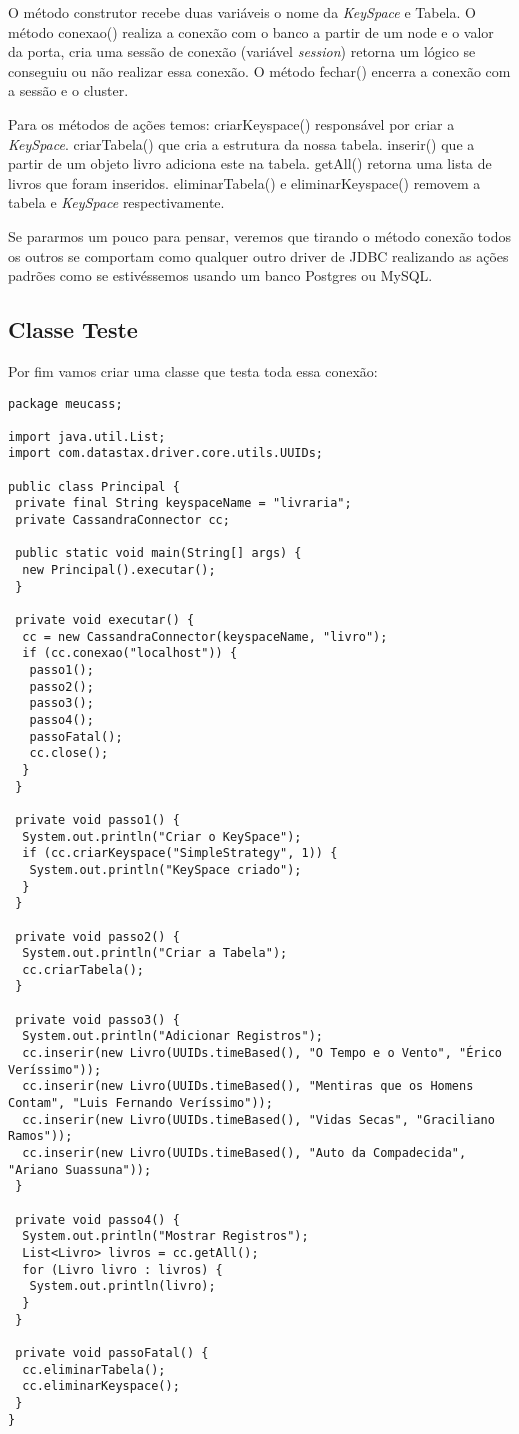 O método construtor recebe duas variáveis o nome da \textit{KeySpace} e Tabela. O método conexao() realiza a conexão com o banco a partir de um node e o valor da porta, cria uma sessão de conexão (variável \textit{session}) retorna um lógico se conseguiu ou não realizar essa conexão. O método fechar() encerra a conexão com a sessão e o cluster.

Para os métodos de ações temos: criarKeyspace() responsável por criar a \textit{KeySpace}. criarTabela() que cria a estrutura da nossa tabela. inserir() que a partir de um objeto livro adiciona este na tabela. getAll() retorna uma lista de livros que foram inseridos. eliminarTabela() e eliminarKeyspace() removem a tabela e \textit{KeySpace} respectivamente.

Se pararmos um pouco para pensar, veremos que tirando o método conexão todos os outros se comportam como qualquer outro driver de JDBC realizando as ações padrões como se estivéssemos usando um banco Postgres ou MySQL.

\subsection{Classe Teste}
Por fim vamos criar uma classe que testa toda essa conexão:
\begin{lstlisting}[]
package meucass;

import java.util.List;
import com.datastax.driver.core.utils.UUIDs;

public class Principal {
 private final String keyspaceName = "livraria";
 private CassandraConnector cc;

 public static void main(String[] args) {
  new Principal().executar();
 }

 private void executar() {
  cc = new CassandraConnector(keyspaceName, "livro");
  if (cc.conexao("localhost")) {
   passo1();
   passo2();
   passo3();
   passo4();
   passoFatal();
   cc.close();
  }
 }

 private void passo1() {
  System.out.println("Criar o KeySpace");
  if (cc.criarKeyspace("SimpleStrategy", 1)) {
   System.out.println("KeySpace criado");
  }
 }

 private void passo2() {
  System.out.println("Criar a Tabela");
  cc.criarTabela();
 }

 private void passo3() {
  System.out.println("Adicionar Registros");
  cc.inserir(new Livro(UUIDs.timeBased(), "O Tempo e o Vento", "Érico Veríssimo"));
  cc.inserir(new Livro(UUIDs.timeBased(), "Mentiras que os Homens Contam", "Luis Fernando Veríssimo"));
  cc.inserir(new Livro(UUIDs.timeBased(), "Vidas Secas", "Graciliano Ramos"));
  cc.inserir(new Livro(UUIDs.timeBased(), "Auto da Compadecida", "Ariano Suassuna"));
 }

 private void passo4() {
  System.out.println("Mostrar Registros");
  List<Livro> livros = cc.getAll();
  for (Livro livro : livros) {
   System.out.println(livro);
  }
 }

 private void passoFatal() {
  cc.eliminarTabela();
  cc.eliminarKeyspace();
 }
}
\end{lstlisting}


